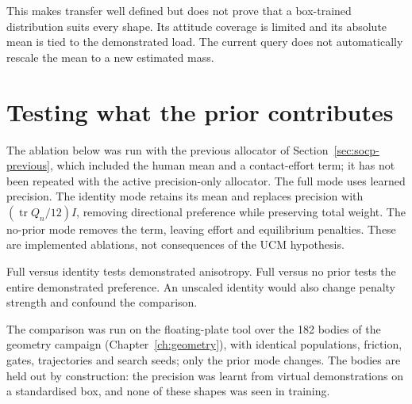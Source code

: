 This makes transfer well defined but does not prove that a box-trained distribution suits every shape. Its attitude coverage is limited and its absolute mean is tied to the demonstrated load. The current query does not automatically rescale the mean to a new estimated mass.

\section{Testing what the prior contributes}

The ablation below was run with the previous allocator of Section~\ref{sec:socp-previous}, which included the human mean and a contact-effort term; it has not been repeated with the active precision-only allocator. The full mode uses learned precision. The identity mode retains its mean and replaces precision with $(\operatorname{tr}Q_n/12)I$, removing directional preference while preserving total weight. The no-prior mode removes the term, leaving effort and equilibrium penalties. These are implemented ablations, not consequences of the UCM hypothesis.

Full versus identity tests demonstrated anisotropy. Full versus no prior tests the entire demonstrated preference. An unscaled identity would also change penalty strength and confound the comparison.

The comparison was run on the floating-plate tool over the 182 bodies of the geometry campaign (Chapter~\ref{ch:geometry}), with identical populations, friction, gates, trajectories and search seeds; only the prior mode changes. The bodies are held out by construction: the precision was learnt from virtual demonstrations on a standardised box, and none of these shapes was seen in training.

